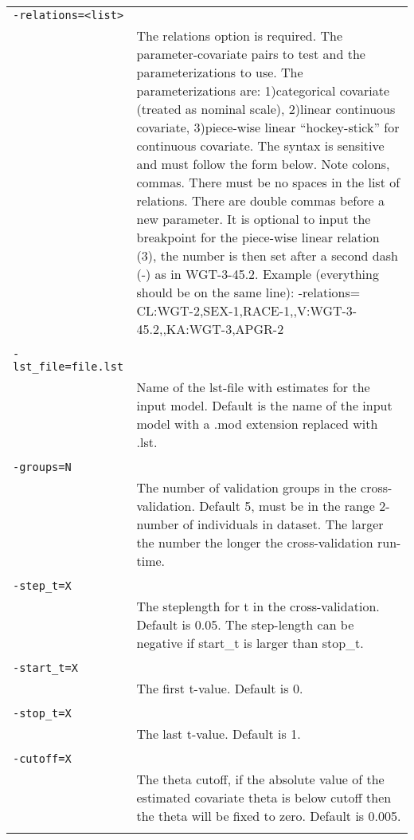 \documentclass[a4paper,12pt]{article}
\begin{document}
\begin{longtable}{p{1in}p{4in}}
\verb|-relations=<list>| & \\
\nopagebreak
 & The relations option is required. The parameter-covariate pairs to test and the parameterizations to use. The parameterizations are: 1)categorical covariate (treated as nominal scale), 2)linear continuous covariate, 3)piece-wise linear “hockey-stick” for continuous covariate. The syntax is sensitive and must follow the form below. Note colons, commas. There must be no spaces in the list of relations. There are double commas before a new parameter. It is optional to input the breakpoint for the piece-wise linear relation (3), the number is then set after a second dash (-) as in WGT-3-45.2. Example (everything should be on the same line):		-relations= CL:WGT-2,SEX-1,RACE-1,,V:WGT-3-45.2,,KA:WGT-3,APGR-2 \\
\\
\verb|-lst_file=file.lst| & \\
\nopagebreak
 & Name of the lst-file with estimates for the input model. Default is the name of the input model with a .mod extension	replaced with .lst. \\
\\
\verb|-groups=N| & \\
\nopagebreak
 & The number of validation groups in the cross-validation. Default 5, must be in the range 2-number of individuals in dataset. The larger the number the longer the cross-validation run-time. \\
\\
\verb|-step_t=X| & \\
\nopagebreak
 & The steplength for t in the cross-validation. Default is 0.05. The step-length can be negative if start\_t is larger than stop\_t. \\
\\
\verb|-start_t=X| & \\
\nopagebreak
 & The first t-value. Default is 0. \\
\\
\verb|-stop_t=X| & \\
\nopagebreak
 & The last t-value. Default is 1. \\
\\
\verb|-cutoff=X| & \\
\nopagebreak
 & The theta cutoff, if the absolute value of the estimated covariate theta is below cutoff then the theta will be fixed to zero. Default is 0.005. \\
\\

\end{longtable}
\end{document}
